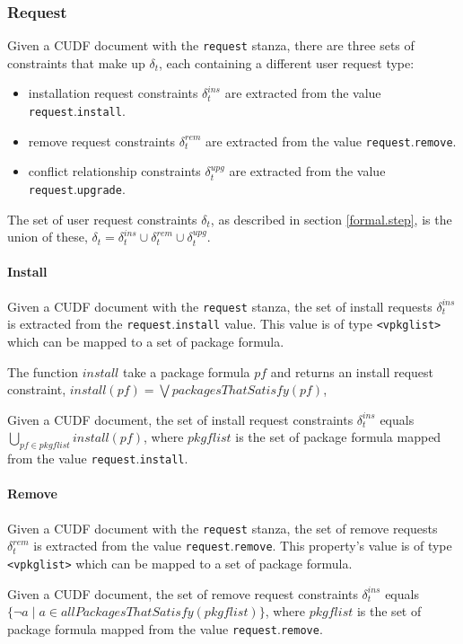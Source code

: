 \subsubsection{Request}
\label{formal.cudf.request}
Given a CUDF document with the \texttt{request} stanza, there are three sets of constraints that make up $\delta_t$, each containing a different user request type:
\begin{itemize}
  \item installation request constraints $\delta_t^{ins}$ are extracted from the value \texttt{request}.\texttt{install}.
  \item remove request constraints  $\delta_t^{rem}$ are extracted from the value \texttt{request}.\texttt{remove}.
  \item conflict relationship constraints $\delta_t^{upg}$ are extracted from the value \texttt{request}.\texttt{upgrade}.
\end{itemize}
The set of user request constraints $\delta_t$, as described in section \ref{formal.step}, is the union of these,
$\delta_t =  \delta_t^{ins} \cup \delta_t^{rem} \cup \delta_t^{upg}$.

\paragraph{Install}
Given a CUDF document with the \texttt{request} stanza, the set of install requests $\delta_t^{ins}$ is extracted from the \texttt{request}.\texttt{install} value.
This value is of type \texttt{<vpkglist>} which can be mapped to a set of package formula.
\begin{defs}
The function  $install$ take a package formula $pf$ and returns an install request constraint, $install(pf) = \bigvee packagesThatSatisfy(pf)$, 
\end{defs}

\begin{defs}
Given a CUDF document, the set of install request constraints $\delta_t^{ins}$  equals
$\bigcup \limits_{pf \in pkgflist} install(pf)$, 
where $pkgflist$ is the set of package formula mapped from the value \texttt{request}.\texttt{install}.
\end{defs}

\paragraph{Remove}
Given a CUDF document with the \texttt{request} stanza, the set of remove requests $\delta_t^{rem}$ is extracted from the value \texttt{request}.\texttt{remove}.
This property's value is of type \texttt{<vpkglist>} which can be mapped to a set of package formula.
\begin{defs}
Given a CUDF document, the set of remove request constraints $\delta_t^{ins}$ equals $\{ \neg a \mid a \in allPackagesThatSatisfy(pkgflist)\}$, 
where $pkgflist$ is the set of package formula mapped from the value \texttt{request}.\texttt{remove}.
\end{defs}


